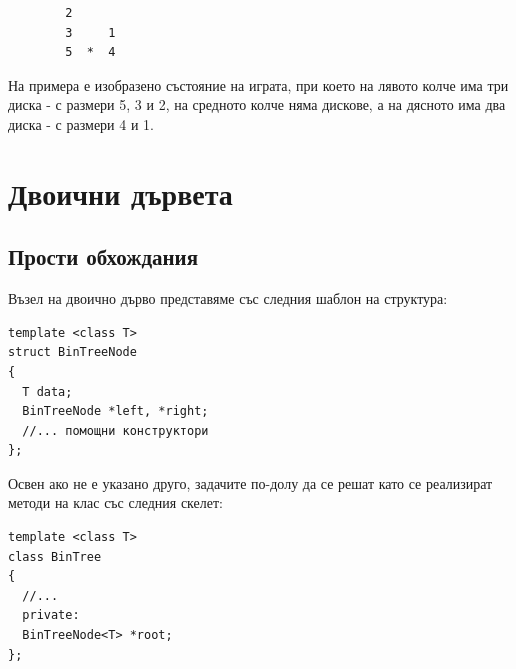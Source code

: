 \begin{enumerate}[resume]
\begin{itemize}
\begin{verbatim}
        2
        3     1
        5  *  4
     \end{verbatim}
   На примера е изобразено състояние на играта, при което на лявото колче има три диска - с размери 5, 3 и 2, на средното колче няма дискове, а на дясното има два диска - с размери 4 и 1.

 \end{itemize}

\end{enumerate}

\pagebreak

\section {Двоични дървета}

\subsection {Прости обхождания}

\begin{mdframed}[hidealllines=true,backgroundcolor=gray!20]
Възел на двоично дърво представяме със следния шаблон на структура:
\begin{verbatim}
template <class T>
struct BinTreeNode
{
  T data;
  BinTreeNode *left, *right;
  //... помощни конструктори
};
\end{verbatim}
Освен ако не е указано друго, задачите по-долу да се решат като се реализират методи на клас  със следния скелет:
\begin{verbatim}
template <class T>
class BinTree
{
  //...
  private:
  BinTreeNode<T> *root;
};
\end{verbatim}
\end{mdframed}

